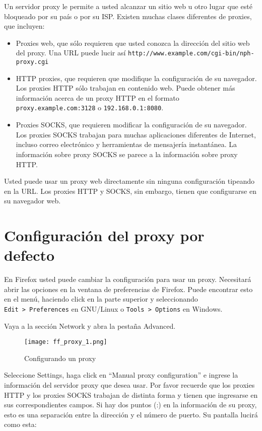 \documentclass[10pt,a5paper,twoside,,]{book}
\providecommand{\tightlist}{%
  \setlength{\itemsep}{0pt}\setlength{\parskip}{0pt}}
\begin{document}
Un servidor proxy le permite a usted alcanzar un sitio web u otro lugar
que esté bloqueado por su país o por su ISP. Existen muchas clases
diferentes de proxies, que incluyen:

\begin{itemize}
\tightlist
\item
  Proxies web, que sólo requieren que usted conozca la dirección del
  sitio web del proxy. Una URL puede lucir así
  \texttt{http://www.example.com/cgi-bin/nph-proxy.cgi}
\item
  HTTP proxies, que requieren que modifique la configuración de su
  navegador. Los proxies HTTP sólo trabajan en contenido web. Puede
  obtener más información acerca de un proxy HTTP en el formato
  \texttt{proxy.example.com:3128} o \texttt{192.168.0.1:8080}.
\item
  Proxies SOCKS, que requieren modificar la configuración de su
  navegador. Los proxies SOCKS trabajan para muchas aplicaciones
  diferentes de Internet, incluso correo electrónico y herramientas de
  mensajería instantánea. La información sobre proxy SOCKS se parece a
  la información sobre proxy HTTP.
\end{itemize}

Usted puede usar un proxy web directamente sin ninguna configuración
tipeando en la URL. Los proxies HTTP y SOCKS, sin embargo, tienen que
configurarse en su navegador web.

\section{Configuración del proxy por
defecto}\label{configuraciuxf3n-del-proxy-por-defecto}

En Firefox usted puede cambiar la configuración para usar un proxy.
Necesitará abrir las opciones en la ventana de preferencias de Firefox.
Puede encontrar esto en el menú, haciendo click en la parte superior y
seleccionando \texttt{Edit\ \textgreater{}\ Preferences} en GNU/Linux o
\texttt{Tools\ \textgreater{}\ Options} en Windows.

Vaya a la sección Network y abra la pestaña Advanced.

\begin{figure}[htbp]
\centering
\texttt{[image: ff\_proxy\_1.png]}
\caption{Configurando un proxy}
\end{figure}

Seleccione Settings, haga click en ``Manual proxy configuration'' e
ingrese la información del servidor proxy que desea usar. Por favor
recuerde que los proxies HTTP y los proxies SOCKS trabajan de distinta
forma y tienen que ingresarse en sus correspondientes campos. Si hay dos
puntos (:) en la información de su proxy, esto es una separación entre
la dirección y el número de puerto. Su pantalla lucirá como esta:
\end{document}

